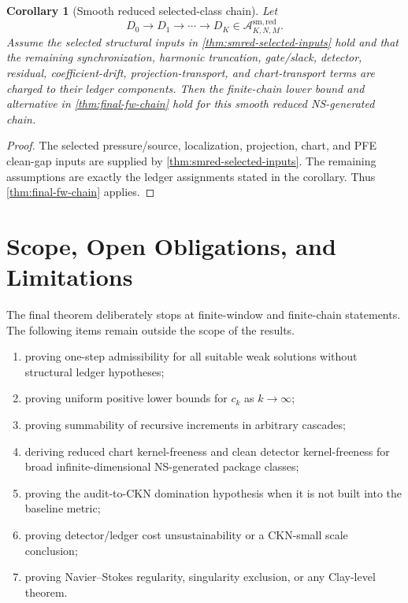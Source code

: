\documentclass[11pt]{article}
\numberwithin{equation}{section}
\theoremstyle{plain}
\newtheorem{corollary}[theorem]{Corollary}
\theoremstyle{definition}
\theoremstyle{remark}
\newcommand{\A}{\mathcal A}
\begin{document}
\begin{corollary}[Smooth reduced selected-class chain]\label{cor:smred-final-chain}
Let
\[
  D_0\to D_1\to\cdots\to D_K\in\A_{K,N,M}^{\mathrm{sm,red}}.
\]
Assume the selected structural inputs in \cref{thm:smred-selected-inputs} hold and that the remaining synchronization, harmonic truncation, gate/slack, detector, residual, coefficient-drift, projection-transport, and chart-transport terms are charged to their ledger components.  Then the finite-chain lower bound and alternative in \cref{thm:final-fw-chain} hold for this smooth reduced NS-generated chain.
\end{corollary}

\begin{proof}
The selected pressure/source, localization, projection, chart, and PFE clean-gap inputs are supplied by \cref{thm:smred-selected-inputs}.  The remaining assumptions are exactly the ledger assignments stated in the corollary.  Thus \cref{thm:final-fw-chain} applies.
\end{proof}


\section{Scope, Open Obligations, and Limitations}
\label{sec:limitations}

The final theorem deliberately stops at finite-window and finite-chain statements.  The following items remain outside the scope of the results.
\begin{enumerate}[label=(\roman*)]
  \item proving one-step admissibility for all suitable weak solutions without structural ledger hypotheses;
  \item proving uniform positive lower bounds for \(c_k\) as \(k\to\infty\);
  \item proving summability of recursive increments in arbitrary cascades;
  \item deriving reduced chart kernel-freeness and clean detector kernel-freeness for broad infinite-dimensional NS-generated package classes;
  \item proving the audit-to-CKN domination hypothesis when it is not built into the baseline metric;
  \item proving detector/ledger cost unsustainability or a CKN-small scale conclusion;
  \item proving Navier--Stokes regularity, singularity exclusion, or any Clay-level theorem.
\end{enumerate}
\end{document}
